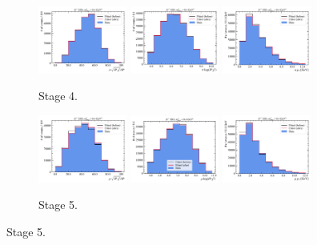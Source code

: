 \begin{figure}[htb]
    \begin{subfigure}{\textwidth}
        \centering
        \includegraphics[width=0.32\textwidth]{./figs-mc-correction/reweighting-final/plot_step3-Dst_iso-pi_comp.pdf}
        \includegraphics[width=0.32\textwidth]{./figs-mc-correction/reweighting-final/plot_step3-Dst_iso-pi_log_ip_chi2.pdf}
        \includegraphics[width=0.32\textwidth]{./figs-mc-correction/reweighting-final/plot_step3-Dst_iso-pi_pt.pdf}
        \caption{Stage 4.}
    \end{subfigure}

    \begin{subfigure}{\textwidth}
        \centering
        \includegraphics[width=0.32\textwidth]{./figs-mc-correction/reweighting-final/plot_step4-Dst_iso-mu_comp.pdf}
        \includegraphics[width=0.32\textwidth]{./figs-mc-correction/reweighting-final/plot_step4-Dst_iso-mu_log_ip_chi2.pdf}
        \includegraphics[width=0.32\textwidth]{./figs-mc-correction/reweighting-final/plot_step4-Dst_iso-mu_pt.pdf}
        \caption{Stage 5.}
    \end{subfigure}


\end{figure}
